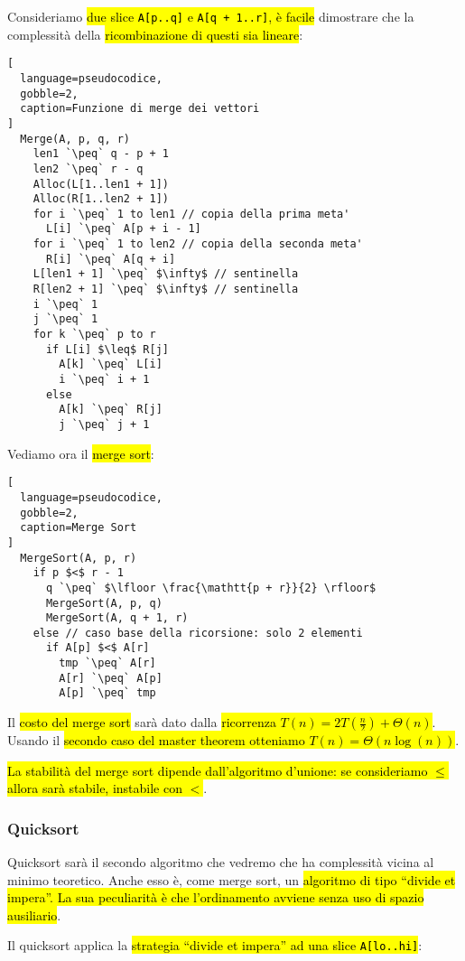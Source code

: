 \documentclass[a4paper,11pt,twoside]{article}
\theoremstyle{plain}
\theoremstyle{definition}
\theoremstyle{remark}
\newcommand{\peq}{$\gets$}
\begin{document}
Consideriamo \hl{due slice \texttt{A[p..q]} e \texttt{A[q + 1..r]}, è facile}
dimostrare che la complessità della \hl{ricombinazione di questi sia lineare}:

\begin{lstlisting}[
  language=pseudocodice,
  gobble=2,
  caption=Funzione di merge dei vettori
]
  Merge(A, p, q, r)
    len1 `\peq` q - p + 1
    len2 `\peq` r - q
    Alloc(L[1..len1 + 1])
    Alloc(R[1..len2 + 1])
    for i `\peq` 1 to len1 // copia della prima meta'
      L[i] `\peq` A[p + i - 1]
    for i `\peq` 1 to len2 // copia della seconda meta'
      R[i] `\peq` A[q + i]
    L[len1 + 1] `\peq` $\infty$ // sentinella
    R[len2 + 1] `\peq` $\infty$ // sentinella
    i `\peq` 1
    j `\peq` 1
    for k `\peq` p to r
      if L[i] $\leq$ R[j]
        A[k] `\peq` L[i]
        i `\peq` i + 1
      else
        A[k] `\peq` R[j]
        j `\peq` j + 1
\end{lstlisting}

Vediamo ora il \hl{merge sort}:

\begin{lstlisting}[
  language=pseudocodice,
  gobble=2,
  caption=Merge Sort
]
  MergeSort(A, p, r)
    if p $<$ r - 1
      q `\peq` $\lfloor \frac{\mathtt{p + r}}{2} \rfloor$
      MergeSort(A, p, q)
      MergeSort(A, q + 1, r)
    else // caso base della ricorsione: solo 2 elementi
      if A[p] $<$ A[r]
        tmp `\peq` A[r]
        A[r] `\peq` A[p]
        A[p] `\peq` tmp
\end{lstlisting}

Il \hl{costo del merge sort} sarà dato dalla \hl{ricorrenza $T(n) =
2T(\frac{n}{2}) + \Theta(n)$}. Usando il \hl{secondo caso del master theorem
otteniamo $T(n) = \Theta(n\log(n))$}.

\hl{La stabilità del merge sort dipende dall'algoritmo d'unione: se consideriamo
$\leq$ allora sarà stabile, instabile con $<$}.

\subsubsection{Quicksort}\label{sec:quicksort}

Quicksort sarà il secondo algoritmo che vedremo che ha complessità vicina al
minimo teoretico. Anche esso è, come merge sort, un\hl{ algoritmo di tipo
``divide et impera''. La sua peculiarità è che l'ordinamento avviene senza uso
di spazio ausiliario}.

Il quicksort applica la \hl{strategia ``divide et impera'' ad una slice
\texttt{A[lo..hi]}}:
\end{document}
